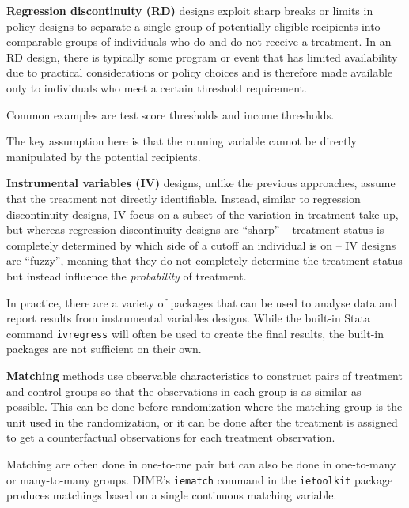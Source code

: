 
\textbf{Regression discontinuity (RD)} designs exploit sharp breaks or limits
in policy designs to separate a single group of potentially eligible recipients
into comparable groups of individuals who do and do not receive a treatment. 
In an RD design, there is typically some program or event
that has limited availability due to practical considerations or policy choices
and is therefore made available only to individuals who meet a certain threshold requirement.

Common examples are test score thresholds and income thresholds.

The key assumption here is that the running variable cannot be directly manipulated
by the potential recipients.


\textbf{Instrumental variables (IV)} designs, unlike the previous approaches,
assume that the treatment not directly identifiable.
Instead, similar to regression discontinuity designs,
IV focus on a subset of the variation in treatment take-up, 
but whereas regression discontinuity designs are ``sharp'' --
treatment status is completely determined by which side of a cutoff an individual is on --
IV designs are ``fuzzy'', meaning that they do not completely determine
the treatment status but instead influence the \textit{probability} of treatment.

In practice, there are a variety of packages that can be used
to analyse data and report results from instrumental variables designs.
While the built-in Stata command \texttt{ivregress} will often be used
to create the final results, the built-in packages are not sufficient on their own.


\textbf{Matching}
 methods use observable characteristics to construct pairs of treatment and control groups so that the observations in each group is as similar as possible. 
This can be done before randomization where the matching group is the unit used in the randomization,
or it can be done after the treatment is assigned to get a counterfactual observations for each treatment observation.

Matching are often done in one-to-one pair but can also be done in one-to-many or many-to-many groups. DIME's \texttt{iematch} command in the \texttt{ietoolkit} package produces matchings based on a single continuous matching variable.


